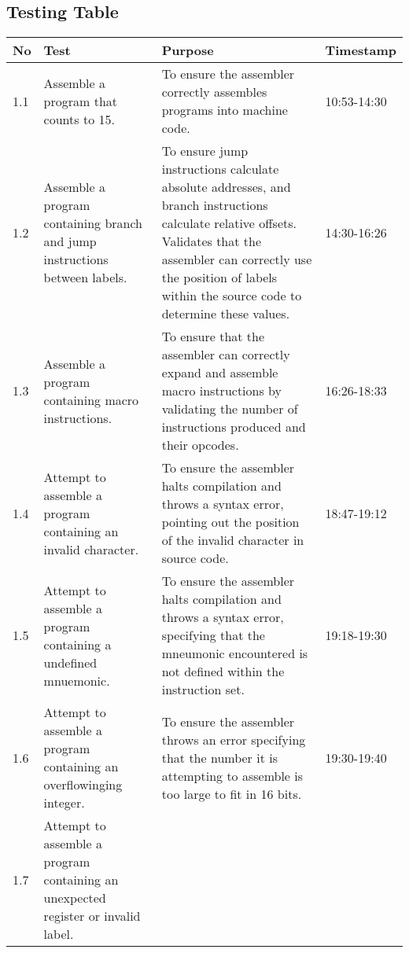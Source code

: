 \subsection{Testing Table}

\begin{longtable}{|p{1cm}|p{5cm}|p{5cm}|p{2cm}|} 
    \hline
        No & Test & Purpose & Timestamp \\ 
    \hline
        1.1
        & 
        Assemble a program that counts to 15. 
        &
        To ensure the assembler correctly assembles programs into machine code.
        & 
        10:53-14:30
        \\
    \hline
        1.2
        & 
        Assemble a program containing branch and jump instructions between labels.
        &
        To ensure jump instructions calculate absolute addresses, and branch instructions calculate relative offsets. Validates that the assembler can correctly use the position of labels within the source code to determine these values.
        & 
        14:30-16:26
        \\
    \hline
        1.3
        & 
        Assemble a program containing macro instructions.
        &
        To ensure that the assembler can correctly expand and assemble macro instructions by validating the number of instructions produced and their opcodes.
        & 
        16:26-18:33
        \\
    \hline
        1.4
        & 
        Attempt to assemble a program containing an invalid character.
        &
        To ensure the assembler halts compilation and throws a syntax error, pointing out the position of the invalid character in source code.
        & 
        18:47-19:12
        \\
    \hline
        1.5
        & 
        Attempt to assemble a program containing a undefined mnuemonic.
        &
        To ensure the assembler halts compilation and throws a syntax error, specifying that the mneumonic encountered is not defined within the instruction set.
        & 
        19:18-19:30
        \\
    \hline
        1.6
        & 
        Attempt to assemble a program containing an overflowinging integer.
        &
        To ensure the assembler throws an error specifying that the number it is attempting to assemble is too large to fit in 16 bits. 
        & 
        19:30-19:40
        \\
    \hline
        1.7
        & 
        Attempt to assemble a program containing an unexpected register or invalid label.

\end{longtable}
